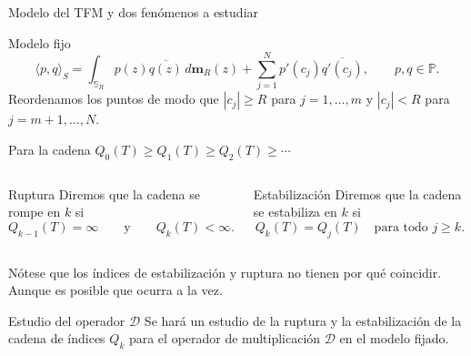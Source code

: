 \documentclass[aspectratio=169,10pt]{beamer}
\newcommand{\Poly}{\mathbb{P}}
\newcommand{\D}{\mathcal{D}}
\begin{document}
\begin{frame}{Modelo del TFM y dos fenómenos a estudiar}
  \scriptsize
  \begin{block}{Modelo fijo}
    \[
      \langle p,q\rangle_S
      =
      \int_{\mathbb{S}_R} p(z)\overline{q(z)}\,d\mathbf{m}_R(z)
      +
      \sum_{j=1}^N p'(c_j)\overline{q'(c_j)},
      \qquad p,q\in\Poly.
    \]
    Reordenamos los puntos de modo que \(|c_j|\ge R\) para \(j=1,\dots,m\) y \(|c_j|<R\) para \(j=m+1,\dots,N\).
  \end{block}

  \small Para la cadena
  \(
  Q_0(T)\ge Q_1(T)\ge Q_2(T)\ge \cdots
  \)

  \scriptsize
  \begin{columns}[T,onlytextwidth]
    \begin{block}{Ruptura}
      Diremos que la cadena se rompe en \(k\) si \[Q_{k-1}(T)=\infty \qquad\text{y}\qquad Q_k(T)<\infty.\]
    \end{block}

    \begin{block}{Estabilización}
      Diremos que la cadena se estabiliza en \(k\) si
      \[
        Q_k(T)=Q_j(T)\quad \text{para todo }j\ge k.
      \]
    \end{block}
  \end{columns}


  Nótese que los índices de estabilización y ruptura no tienen por qué coincidir. Aunque es posible que ocurra a la vez.


  \small
  \begin{alertblock}{Estudio del operador \(\D\)}
    Se hará un estudio de la ruptura y la estabilización de la cadena de índices \(Q_k\) para el operador de multiplicación \(\D\) en el modelo fijado.
  \end{alertblock}

\end{frame}
\end{document}
